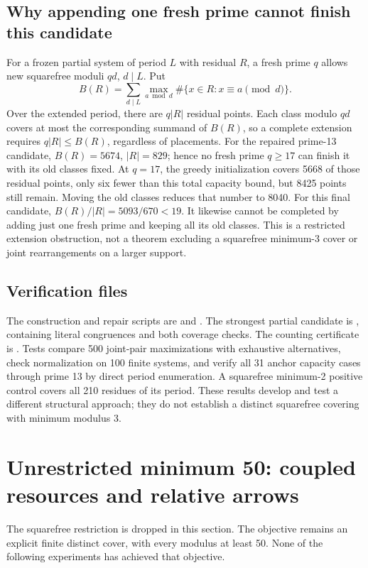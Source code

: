 \documentclass[11pt]{article}
\begin{document}
\subsection{Why appending one fresh prime cannot finish this candidate}
For a frozen partial system of period $L$ with residual $R$, a fresh prime
$q$ allows new squarefree moduli $qd$, $d\mid L$. Put
\[
 B(R)=\sum_{d\mid L}\max_{a\bmod d}\#\{x\in R:x\equiv a\pmod d\}.
\]
Over the extended period, there are $q|R|$ residual points. Each class
modulo $qd$ covers at most the corresponding summand of $B(R)$, so a
complete extension requires $q|R|\le B(R)$, regardless of placements.
For the repaired prime-13 candidate, $B(R)=5674$, $|R|=829$; hence no
fresh prime $q\ge17$ can finish it with its old classes fixed.
At $q=17$, the greedy initialization covers 5668 of those residual points,
only six fewer than this total capacity bound, but 8425 points still
remain. Moving the old classes reduces that number to 8040.
For this final candidate, $B(R)/|R|=5093/670<19$. It likewise cannot be
completed by adding just one fresh prime and keeping all its old classes.
This is a restricted extension obstruction, not a theorem excluding a
squarefree minimum-3 cover or joint rearrangements on a larger support.

\subsection{Verification files}
The construction and repair scripts are
 and
. The strongest partial candidate is
, containing literal
congruences and both coverage checks. The counting certificate is
.
Tests compare 500 joint-pair maximizations with exhaustive alternatives,
check normalization on 100 finite systems, and verify all 31 anchor
capacity cases through prime 13 by direct period enumeration. A squarefree
minimum-2 positive control covers all 210 residues of its period.
These results develop and test a different structural approach; they do
not establish a distinct squarefree covering with minimum modulus 3.

\section{Unrestricted minimum 50: coupled resources and relative arrows}
\label{sec:general50}
The squarefree restriction is dropped in this section. The objective remains
an explicit finite distinct cover, with every modulus at least 50. None of
the following experiments has achieved that objective.
\end{document}
